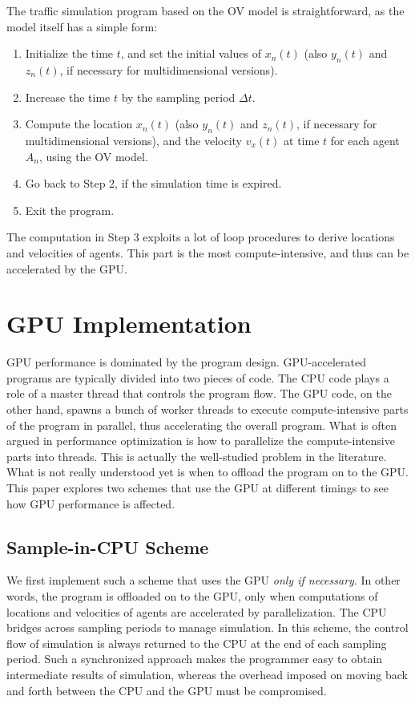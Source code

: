 \documentclass[times, 10pt, twocolumn]{article}
\begin{document}
The traffic simulation program based on the OV model is straightforward,
as the model itself has a simple form:

\begin{enumerate}
 \item Initialize the time $t$, and set the initial values of $x_n(t)$
       (also $y_n(t)$ and $z_n(t)$, if necessary for multidimensional
       versions).
 \item Increase the time $t$ by the sampling period $\Delta t$.
 \item Compute the location $x_n(t)$ (also $y_n(t)$ and $z_n(t)$, if
       necessary for multidimensional versions), and the velocity
       $v_x(t)$ at time $t$ for each agent $A_n$, using the OV model.
 \item Go back to Step 2, if the simulation time is expired.
 \item Exit the program.
\end{enumerate}

The computation in Step 3 exploits a lot of loop procedures to derive
locations and velocities of agents.
This part is the most compute-intensive, and thus can be accelerated by
the GPU.

\section{GPU Implementation}
\label{sec:gpu_implementations}

GPU performance is dominated by the program design.
GPU-accelerated programs are typically divided into two pieces of code.
The CPU code plays a role of a master thread that controls the program
flow.
The GPU code, on the other hand, spawns a bunch of worker threads to
execute compute-intensive parts of the program in parallel, thus
accelerating the overall program.
What is often argued in performance optimization is how to parallelize
the compute-intensive parts into threads.
This is actually the well-studied problem in the literature.
What is not really understood yet is when to offload the program on to
the GPU.
This paper explores two schemes that use the GPU at different timings to
see how GPU performance is affected.

\subsection{Sample-in-CPU Scheme}
\label{sec:sample-in-cpu}

We first implement such a scheme that uses the GPU \textit{only if
necessary}.
In other words, the program is offloaded on to the GPU, only when
computations of locations and velocities of agents are accelerated by
parallelization.
The CPU bridges across sampling periods to manage simulation.
In this scheme, the control flow of simulation is always returned to the
CPU at the end of each sampling period.
Such a synchronized approach makes the programmer easy to
obtain intermediate results of simulation, whereas the overhead imposed
on moving back and forth between the CPU and the GPU must be
compromised.
\end{document}
